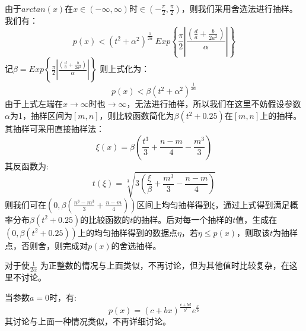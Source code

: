 \documentclass[a4paper,11pt]{article}
\begin{document}
由于$arctan(x)$在$x \in (-\infty,\infty )$时$\in (-\frac{\pi}{2},\frac{\pi}{2})$，则我们采用舍选法进行抽样。
我们有：
\begin{equation}
	p(x)<(t^{2}+\alpha^{2})^{\frac{1}{2\alpha}}~Exp\left\{  \frac{\pi}{2}\left|       \frac{  (\frac{d}{a}+\frac{b}{2a^{2}}) }{\alpha}  
	\right|
	 \right\}
\end{equation}
记$\beta = Exp\left\{ \frac{\pi}{2} \left|       \frac{  (\frac{d}{a}+\frac{b}{2a^{2}}) }{\alpha}  
	\right|
	 \right\}$
则上式化为：
\begin{equation}
	p(x)<\beta (t^{2}+\alpha^{2})^{\frac{1}{2\alpha}}
\end{equation}
由于上式左端在$x\rightarrow \infty$时也$\rightarrow \infty$，无法进行抽样，所以我们在这里不妨假设参数$\alpha$为1，抽样区间为$[m,n]$，则比较函数简化为$\beta(t^{2}+0.25)$在$[m,n]$上的抽样。其抽样可采用直接抽样法：
\begin{equation}
	\xi(x) = \beta \left( \frac{t^{3}}{3} + \frac{n-m}{4}-\frac{m^{3}}{3} \right)
\end{equation}
其反函数为:
\begin{equation}
	t(\xi) = \sqrt[3]{3(\frac{\xi}{\beta} + \frac{m^{3}}{3} - \frac{n-m}{4} )}
\end{equation}
则我们可在$\left (0,\beta \left (\frac{n^{3}-m^{3}}{3}+\frac{n-m}{4} \right) \right)$区间上均匀抽样得到$\xi$，通过上式得到满足概率分布$\beta(t^{2}+0.25)$的比较函数的$t$的抽样。后对每一个抽样的$t$值，生成在$(0,\beta(t^{2}+0.25))$上的均匀抽样得到的数据点$\eta$，若$\eta \leq p(x)$，则取该$t$为抽样点，否则舍，则完成对$p(x)$的舍选抽样。

对于使$\frac{1}{2\alpha}$ 为正整数的情况与上面类似，不再讨论，但为其他值时比较复杂，在这里不讨论。

当参数$a = 0$时，有:
\begin{equation}
	p(x) = (c+bx)^{\frac{c+bd}{b^{2}}}e^{\frac{x}{b}}
\end{equation}
其讨论与上面一种情况类似，不再详细讨论。
\end{document}
